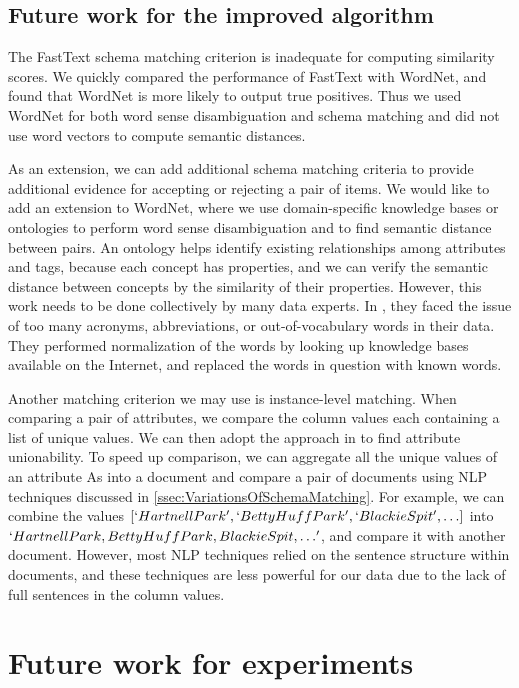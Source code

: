 \subsection{Future work for the improved algorithm}

The FastText schema matching criterion is inadequate for computing similarity scores. We quickly compared the performance of FastText with WordNet, and found that WordNet is more likely to output true positives. Thus we used WordNet for both word sense disambiguation and schema matching and did not use word vectors to compute semantic distances.

As an extension, we can add additional schema matching criteria to provide additional evidence for accepting or rejecting a pair of items. We would like to add an extension to WordNet, where we use domain-specific knowledge bases or ontologies to perform word sense disambiguation and to find semantic distance between pairs. An ontology helps identify existing relationships among attributes and tags, because each concept has properties, and we can verify the semantic distance between concepts by the similarity of their properties. However, this work needs to be done collectively by many data experts. In \cite{Sorrentino2011NORMS}, they faced the issue of too many acronyms, abbreviations, or out-of-vocabulary words in their data. They performed normalization of the words by looking up knowledge bases available on the Internet, and replaced the words in question with known words.

Another matching criterion we may use is instance-level matching. When comparing a pair of attributes, we compare the column values each containing a list of unique values. We can then adopt the approach in \cite{Nargesian2018Table} to find attribute unionability. To speed up comparison, we can aggregate all the unique values of an attribute As into a document and compare a pair of documents using NLP techniques discussed in \autoref{ssec:VariationsOfSchemaMatching}. For example, we can combine the values $[`HartnellPark',`BettyHuffPark',`BlackieSpit',\ldots]$ into\\ $`HartnellPark,BettyHuffPark,BlackieSpit,\ldots'$, and compare it with another document. However, most NLP techniques relied on the sentence structure within documents, and these techniques are less powerful for our data due to the lack of full sentences in the column values.

\section{Future work for experiments}
\label{sec:FutureWorkForExperiments}


